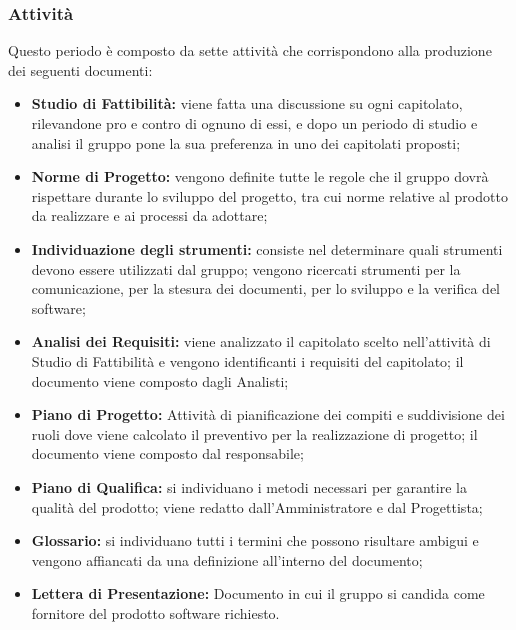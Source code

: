 \subsubsection{Attività}
Questo periodo è composto da sette attività che corrispondono alla produzione dei seguenti documenti:
\begin{itemize}
	\item \textbf{Studio di Fattibilità:} viene fatta una discussione su ogni capitolato, rilevandone pro e contro di ognuno di essi, e dopo un periodo di studio e analisi il gruppo pone la sua preferenza in uno dei capitolati proposti;
	\item \textbf{Norme di Progetto:} vengono definite tutte le regole che il gruppo dovrà rispettare durante lo sviluppo del progetto, tra cui norme relative al prodotto da realizzare e ai processi da adottare;
	\item \textbf{Individuazione degli strumenti:} consiste nel determinare quali strumenti devono essere utilizzati dal gruppo; vengono ricercati strumenti per la comunicazione, per la stesura dei documenti, per lo sviluppo e la verifica del software;
	\item \textbf{Analisi dei Requisiti:} viene analizzato il capitolato scelto nell'attività di Studio di Fattibilità e vengono identificanti i requisiti del capitolato; il documento viene composto dagli Analisti;
	\item \textbf{Piano di Progetto:} Attività di pianificazione dei compiti e suddivisione dei ruoli dove viene calcolato il preventivo per la realizzazione di progetto; il documento viene composto dal responsabile;
	\item \textbf{Piano di Qualifica:} si individuano i metodi necessari per garantire la qualità del prodotto; viene redatto dall'Amministratore e dal Progettista;
	\item\textbf{Glossario:} si individuano tutti i termini che possono risultare ambigui e vengono affiancati da una definizione all'interno del documento;  
	\item \textbf{Lettera di Presentazione:} Documento in cui il gruppo \Gruppo{} si candida come fornitore del prodotto software richiesto.
\end{itemize}
